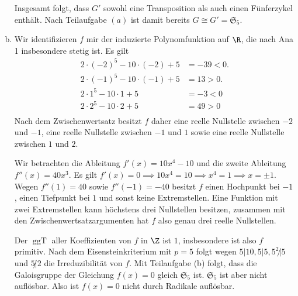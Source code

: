 \documentclass{article}
\begin{document}
\begin{enumerate}[(a)]
    Insgesamt folgt, dass $G'$ sowohl eine Transposition als auch einen Fünferzykel enthält.
    Nach Teilaufgabe $(a)$ ist damit bereits $G \cong G' = \mathfrak{S}_5$. 
    \item Wir identifizieren $f$ mir der induzierte Polynomfunktion auf $\R$, die nach Ana 1 insbesondere stetig ist.
    Es gilt 
    \begin{align*}
        2\cdot (-2)^5 - 10\cdot (-2) + 5 &= -39 < 0.\\
        2\cdot (-1)^5 - 10\cdot (-1) + 5 &= 13 > 0.\\
        2 \cdot 1^5 - 10\cdot 1 + 5 &= -3 < 0\\
        2 \cdot 2^5 - 10 \cdot 2 +5 &= 49 > 0\\
    \end{align*}
    Nach dem Zwischenwertsatz besitzt $f$ daher eine reelle Nullstelle zwischen $-2$ und $-1$, eine reelle Nullstelle 
    zwischen $-1$ und $1$ sowie eine reelle Nullstelle zwischen $1$ und $2$.

    Wir betrachten die Ableitung $f'(x) = 10x^4 - 10$ und die zweite Ableitung $f''(x) = 40x^3$.
    Es gilt $f'(x) = 0 \implies 10x^4 = 10 \implies x^4 = 1 \implies x = \pm 1$. Wegen $f''(1) = 40$
    sowie $f''(-1) = -40$ besitzt $f$ einen Hochpunkt bei $-1$, einen Tiefpunkt bei $1$ und sonst keine Extremstellen.
    Eine Funktion mit zwei Extremstellen kann höchstens drei Nullstellen besitzen, zusammen mit den Zwischenwertsatzargumenten
    hat $f$ also genau drei reelle Nullstellen.
    
    Der $\operatorname{ggT}$ aller Koeffizienten von $f$ in $\Z$ ist $1$, insbesondere ist also $f$ primitiv.
    Nach dem Eisensteinkriterium mit $p = 5$ folgt wegen $5 | 10, 5| 5, 5^2\not | 5$ und $5 \not | 2$ die Irreduzibilität von $f$.
    Mit Teilaufgabe (b) folgt, dass die Galoisgruppe der Gleichung $f(x) = 0$ gleich $\mathfrak{S}_5$ ist. $\mathfrak{S}_5$
    ist aber nicht auflösbar. Also ist $f(x) = 0$ nicht durch Radikale auflösbar.
\end{enumerate}
\end{document}
